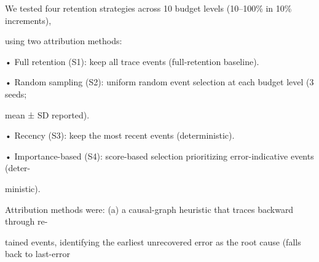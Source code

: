 \begin{flushleft}
\noindent  We tested four retention strategies across 10 budget levels (10–100\% in 10\% increments),\par
\noindent using two attribution methods:\par
\noindent  • Full retention (S1): keep all trace events (full-retention baseline).\par
\noindent  • Random sampling (S2): uniform random event selection at each budget level (3 seeds;\par
\noindent  mean ± SD reported).\par
\noindent  • Recency (S3): keep the most recent events (deterministic).\par
\noindent  • Importance-based (S4): score-based selection prioritizing error-indicative events (deter-\par
\noindent  ministic).\par
\noindent  Attribution methods were: (a) a causal-graph heuristic that traces backward through re-\par
\noindent tained events, identifying the earliest unrecovered error as the root cause (falls back to last-error\par
\end{flushleft}
